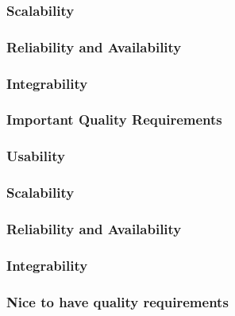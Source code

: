 \documentclass[a4paper,12pt,titlepage]{article}
\begin{document}
			\subsubsection{Scalability}
			
			
			\subsubsection{Reliability and Availability}
			
			
			\subsubsection{Integrability}



	\subsubsection{Important Quality Requirements}
			
			\subsubsection{Usability}
			
			
			\subsubsection{Scalability}
			
			
			\subsubsection{Reliability and Availability}
			
			
			\subsubsection{Integrability}
			



	\subsubsection{Nice to have quality requirements}
\end{document}
